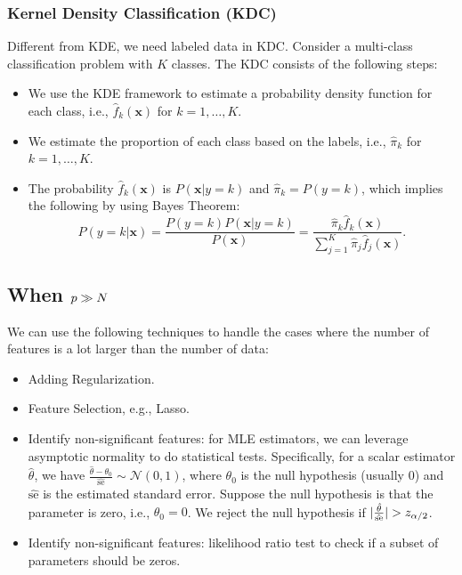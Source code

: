     \subsubsection{Kernel Density Classification (KDC)}
        Different from KDE, we need labeled data in KDC.
        Consider a multi-class classification problem with $K$ classes.
        The KDC consists of the following steps:
            \begin{itemize}
                \item We use the KDE framework to estimate a probability density function for each class, i.e., $\hat{f}_k(\bm{x})$ for $k=1,\ldots, K$.
                \item We estimate the proportion of each class based on the labels, i.e., $\hat{\pi}_k$ for $k=1,\ldots, K$.
                \item The probability $\hat{f}_k(\bm{x})$ is $P(\bm{x} | y=k)$ and $\hat{\pi}_k = P(y=k)$, which implies the following by using Bayes Theorem:
                    \begin{equation}
                        P(y=k | \bm{x}) = \frac{P(y=k) P(\bm{x} | y=k)}{P(\bm{x})} = \frac{\hat{\pi}_k \hat{f}_k(\bm{x}) }{\sum_{j=1}^{K}{ \hat{\pi}_j \hat{f}_j(\bm{x})   }}.
                    \end{equation}
            \end{itemize}
            
            
    \subsection{When $p \gg N$}
        We can use the following techniques to handle the cases where the number of features is a lot larger than the number of data:
            \begin{itemize}
                \item Adding Regularization.
                \item Feature Selection, e.g., Lasso.
                \item Identify non-significant features: for MLE estimators, we can leverage asymptotic normality to do statistical tests.
                Specifically, for a scalar estimator $\hat{\theta}$, we have $\frac{\hat{\theta} - \theta_0 }{\hat{\text{se}}} \sim \mathcal{N}(0, 1)$, where $\theta_0$ is the null hypothesis (usually $0$) and $\hat{\text{se}}$ is the estimated standard error.
                Suppose the null hypothesis is that the parameter is zero, i.e., $\theta_0=0$. 
                We reject the null hypothesis if $| \frac{\hat{\theta} }{\hat{\text{se}}} | > z_{\alpha/2}$.
                \item Identify non-significant features: likelihood ratio test to check if a subset of parameters should be zeros.
            \end{itemize}
    